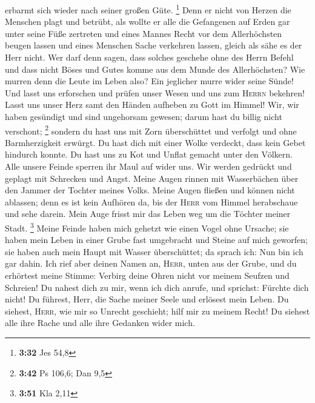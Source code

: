erbarmt sich wieder nach seiner großen Güte. \footnote{\textbf{3:32} Jes
  54,8}  Denn er nicht von Herzen die Menschen plagt und
betrübt,  als wollte er alle die Gefangenen auf Erden gar
unter seine Füße zertreten  und eines Mannes Recht vor
dem Allerhöchsten beugen lassen  und eines Menschen Sache
verkehren lassen, gleich als sähe es der Herr nicht.  Wer
darf denn sagen, dass solches geschehe ohne des Herrn Befehl
 und dass nicht Böses und Gutes komme aus dem Munde des
Allerhöchsten?  Wie murren denn die Leute im Leben also?
Ein jeglicher murre wider seine Sünde!  Und lasst uns
erforschen und prüfen unser Wesen und uns zum \textsc{Herrn} bekehren!
 Lasst uns unser Herz samt den Händen aufheben zu Gott im
Himmel!  Wir, wir haben gesündigt und sind ungehorsam
gewesen; darum hast du billig nicht verschont; \footnote{\textbf{3:42}
  Ps 106,6; Dan 9,5}  sondern du hast uns mit Zorn
überschüttet und verfolgt und ohne Barmherzigkeit erwürgt.
 Du hast dich mit einer Wolke verdeckt, dass kein Gebet
hindurch konnte.  Du hast uns zu Kot und Unflat gemacht
unter den Völkern.  Alle unsere Feinde sperren ihr Maul
auf wider uns.  Wir werden gedrückt und geplagt mit
Schrecken und Angst.  Meine Augen rinnen mit Wasserbächen
über den Jammer der Tochter meines Volks.  Meine Augen
fließen und können nicht ablassen; denn es ist kein Aufhören da,
 bis der \textsc{Herr} vom Himmel herabschaue und sehe
darein.  Mein Auge frisst mir das Leben weg um die
Töchter meiner Stadt. \footnote{\textbf{3:51} Kla 2,11} 
Meine Feinde haben mich gehetzt wie einen Vogel ohne Ursache;
 sie haben mein Leben in einer Grube fast umgebracht und
Steine auf mich geworfen;  sie haben auch mein Haupt mit
Wasser überschüttet; da sprach ich: Nun bin ich gar dahin.
 Ich rief aber deinen Namen an, \textsc{Herr}, unten aus
der Grube,  und du erhörtest meine Stimme: Verbirg deine
Ohren nicht vor meinem Seufzen und Schreien!  Du nahest
dich zu mir, wenn ich dich anrufe, und sprichst: Fürchte dich nicht!
 Du führest, Herr, die Sache meiner Seele und erlösest
mein Leben.  Du siehest, \textsc{Herr}, wie mir so
Unrecht geschieht; hilf mir zu meinem Recht!  Du siehest
alle ihre Rache und alle ihre Gedanken wider mich. 
